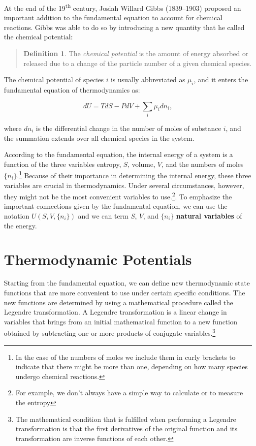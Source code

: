 \documentclass[
  9pt,
]{extbook}
\theoremstyle{definition}
\newtheorem{definition}{Definition}[chapter]
\theoremstyle{definition}
\theoremstyle{definition}
\theoremstyle{remark}
\begin{document}
At the end of the 19\textsuperscript{th} century, Josiah Willard Gibbs (1839--1903) proposed an important addition to the fundamental equation to account for chemical reactions. Gibbs was able to do so by introducing a new quantity that he called the chemical potential:

\begin{quote}
\begin{definition}
\protect\hypertarget{def:chemicalpot}{}{\label{def:chemicalpot} }The \emph{chemical potential} is the amount of energy absorbed or released due to a change of the particle number of a given chemical species.
\end{definition}
\end{quote}

The chemical potential of species \(i\) is usually abbreviated as \(\mu_i\), and it enters the fundamental equation of thermodynamics as:

\begin{equation}
dU = TdS-PdV+\sum_i\mu_i dn_i,
\label{eq:dunv2}
\end{equation}

where \(dn_i\) is the differential change in the number of moles of substance \(i\), and the summation extends over all chemical species in the system.

According to the fundamental equation, the internal energy of a system is a function of the three variables entropy, \(S\), volume, \(V\), and the numbers of moles \(\{n_i\}\).\footnote{In the case of the numbers of moles we include them in curly brackets to indicate that there might be more than one, depending on how many species undergo chemical reactions.} Because of their importance in determining the internal energy, these three variables are crucial in thermodynamics. Under several circumstances, however, they might not be the most convenient variables to use.\footnote{For example, we don't always have a simple way to calculate or to measure the entropy}. To emphasize the important connections given by the fundamental equation, we can use the notation \(U(S,V,\{n_i\})\) and we can term \(S\), \(V\), and \(\{n_i\}\) \textbf{natural variables} of the energy.

\hypertarget{thermpot}{%
\section{Thermodynamic Potentials}\label{thermpot}}

Starting from the fundamental equation, we can define new thermodynamic state functions that are more convenient to use under certain specific conditions. The new functions are determined by using a mathematical procedure called the Legendre transformation. A Legendre transformation is a linear change in variables that brings from an initial mathematical function to a new function obtained by subtracting one or more products of conjugate variables.\footnote{The mathematical condition that is fulfilled when performing a Legendre transformation is that the first derivatives of the original function and its transformation are inverse functions of each other.}
\end{document}
